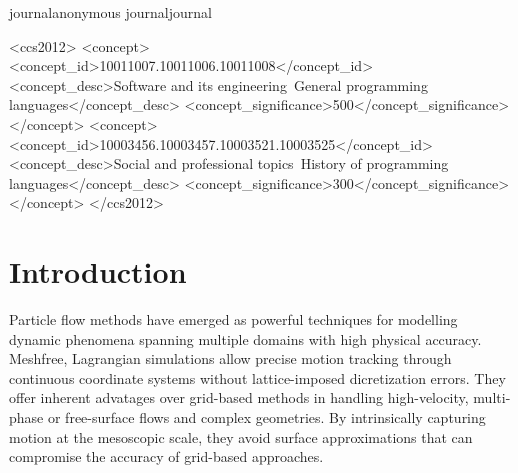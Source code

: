 \documentclass[review, anonymous, acmsmall]{acmart}
\def\acmversionanonymous{anonymous}
\def\acmversionjournal{journal}
\def\acmversion{anonymous}
\def\acmversion{journal}
\begin{document}
\ifx\acmversion\acmversionanonymous
{} %
\renewcommand\footnotetextcopyrightpermission[1]{} %
\fi
\ifx\acmversion\acmversionjournal
\begin{CCSXML}
<ccs2012>
<concept>
<concept_id>10011007.10011006.10011008</concept_id>
<concept_desc>Software and its engineering~General programming languages</concept_desc>
<concept_significance>500</concept_significance>
</concept>
<concept>
<concept_id>10003456.10003457.10003521.10003525</concept_id>
<concept_desc>Social and professional topics~History of programming languages</concept_desc>
<concept_significance>300</concept_significance>
</concept>
</ccs2012>
\end{CCSXML}


\fi

\maketitle

\section{Introduction}
Particle flow methods have emerged as powerful techniques for modelling dynamic phenomena spanning multiple domains with high physical accuracy.
Meshfree, Lagrangian simulations allow precise motion tracking through continuous coordinate systems without lattice-imposed dicretization errors.
They offer inherent advatages over grid-based methods in handling high-velocity, multi-phase or free-surface flows and complex geometries.
By intrinsically capturing motion at the mesoscopic scale, they avoid surface approximations that can compromise the accuracy of grid-based approaches.
\end{document}
